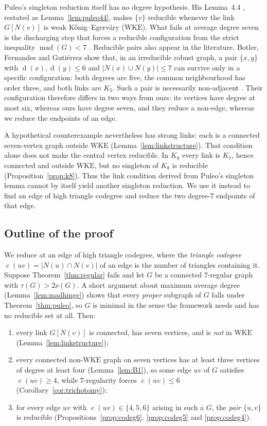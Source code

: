 \documentclass[11pt,a4paper]{amsart}
\theoremstyle{plain}
\theoremstyle{definition}
\newcommand{\mad}{\operatorname{mad}}
\newcommand{\WKE}{\mathrm{WKE}}
\newcommand{\cod}{\operatorname{c}}
\newcommand{\N}{N}
\newcommand{\dg}{\operatorname{d}}
\begin{document}
Puleo's singleton reduction itself has no degree hypothesis. His
Lemma~4.4 \cite{Puleo2015}, restated as Lemma~\ref{lem:puleo44}, makes
$\{v\}$ reducible whenever the link $G[\N(v)]$ is weak
K\H{o}nig--Egerv\'ary ($\WKE$). What fails at average degree seven is the discharging step that
forces a reducible configuration from the strict inequality
$\mad(G)<7$ \cite[Lemmas 2.7, 2.8]{Puleo2015}. Reducible pairs also appear in
the literature. Botler, Fernandes and Guti\'errez
\cite[Lemma 3.3]{BotlerFG2021} show that, in an irreducible robust graph, a
pair $\{x,y\}$ with $\dg(x),\dg(y)\le6$ and
$|\N(x)\cup\N(y)|\le7$ can survive only in a specific configuration: both
degrees are five, the common neighbourhood has order three, and both links
are $K_5$. Such a pair is necessarily non-adjacent
\cite[Lemma 3.2(b)]{BotlerFG2021}. Their configuration therefore differs in
two ways from ours: its vertices have degree at most six, whereas ours have
degree seven, and they reduce a non-edge, whereas we reduce the endpoints of
an edge.

A hypothetical counterexample nevertheless has strong links: each is a
connected seven-vertex graph outside $\WKE$
(Lemma~\ref{lem:linkstructure}). That condition alone does not make the
central vertex reducible. In $K_8$ every link is $K_7$, hence connected and
outside $\WKE$, but no singleton of $K_8$ is reducible
(Proposition~\ref{prop:k8}). Thus the link condition derived from Puleo's
singleton lemma cannot by itself yield another singleton reduction. We use it
instead to find an edge of high triangle codegree and reduce the two degree-$7$
endpoints of that edge.

\subsection{Outline of the proof}\label{subsec:method}

We reduce at an edge of high triangle codegree, where the
\emph{triangle codegree} $\cod(uv)=|\N(u)\cap\N(v)|$ of an edge is the number
of triangles containing it. Suppose
Theorem~\ref{thm:regular} fails and let $G$ be a connected $7$-regular graph
with $\tau(G)>2\nu(G)$. A short argument about maximum average degree
(Lemma~\ref{lem:madhinge}) shows that every \emph{proper} subgraph of $G$
falls under Theorem~\ref{thm:puleo}, so $G$ is minimal in the sense the
framework needs and has no reducible set at all. Then:

\begin{enumerate}
  \item every link $G[\N(v)]$ is connected, has seven vertices, and is
    \emph{not} in $\WKE$ (Lemma~\ref{lem:linkstructure});
  \item every connected non-$\WKE$ graph on seven vertices has at least three
    vertices of degree at least four (Lemma~\ref{lem:B1}), so some edge $uv$
    of $G$ satisfies $\cod(uv)\ge 4$, while $7$-regularity forces
    $\cod(uv)\le 6$ (Corollary~\ref{cor:trichotomy});
  \item for every edge $uv$ with $\cod(uv)\in\{4,5,6\}$ arising in such a $G$,
    the \emph{pair} $\{u,v\}$ is reducible
    (Propositions~\ref{prop:codeg6}, \ref{prop:codeg5} and
    \ref{prop:codeg4}).
\end{enumerate}
\end{document}

